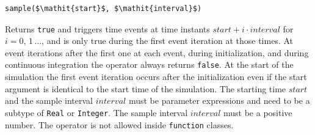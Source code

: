\begin{operatordefinition*}[sample]\label{modelica:event-sample}
\begin{synopsis}\begin{lstlisting}
sample($\mathit{start}$, $\mathit{interval}$)
\end{lstlisting}\end{synopsis}
\begin{semantics}
Returns \lstinline!true! and triggers time events at time instants $\mathit{start} + i \cdot \mathit{interval}$ for $i = 0,\, 1\, \ldots$, and is only true during the first event iteration at those times.
At event iterations after the first one at each event, during initialization, and during continuous integration the operator always returns \lstinline!false!.
At the start of the simulation the first event iteration occurs after the initialization even if the start argument is identical to the start time of the simulation.
The starting time $\mathit{start}$ and the sample interval $\mathit{interval}$ must be parameter expressions and need to be a subtype of \lstinline!Real! or \lstinline!Integer!.
The sample interval $\mathit{interval}$ must be a positive number.
The operator is not allowed inside \lstinline!function! classes.
\end{semantics}
\end{operatordefinition*}

